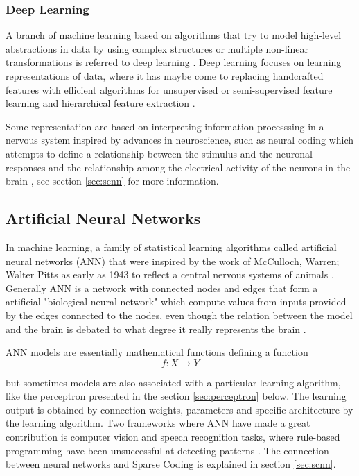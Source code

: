 \subsubsection{Deep Learning}
\label{sec:deeplearning}

A branch of machine learning based on algorithms that try to model high-level abstractions in data by using complex structures or multiple non-linear transformations is referred to deep learning \cite{deep, deep2}. Deep learning focuses on learning representations of data, where it has maybe come to replacing handcrafted features with efficient algorithms for unsupervised or semi-supervised feature learning and hierarchical feature extraction \cite{deep3}.

Some representation are based on interpreting information processsing in a nervous system inspired by advances in neuroscience, such as neural coding which attempts to define a relationship between the stimulus and the neuronal responses and the relationship among the electrical activity of the neurons in the brain \cite{nervous}, see section \ref{sec:scnn} for more information.



\subsection{Artificial Neural Networks}
\label{sec:ann}

In machine learning, a family of statistical learning algorithms called artificial neural networks (ANN) that were inspired by the work of McCulloch, Warren; Walter Pitts as early as 1943 to reflect a central nervous systems of animals \cite{1943}. Generally ANN is a network with connected nodes and edges that form a artificial "biological neural network" which compute values from inputs provided by the edges connected to the nodes, even though the relation between the model and the brain is debated to what degree it really represents the brain \cite{brain}. 

ANN models are essentially mathematical functions defining a function 
\begin{equation} 
f : X \rightarrow Y
\end{equation}

but sometimes models are also associated with a particular learning algorithm, like the perceptron presented in the section \ref{sec:perceptron} below. The learning output is obtained by connection weights, parameters and specific architecture by the learning algorithm. Two frameworks where ANN have made a great contribution is computer vision and speech recognition tasks, where rule-based programming have been unsuccessful at detecting patterns \cite{perceptron}. The connection between neural networks and Sparse Coding is explained in section \ref{sec:scnn}.

